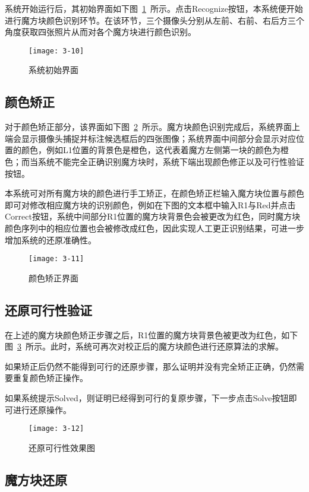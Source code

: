 系统开始运行后，其初始界面如下图~\ref{fig:3-10}~所示。点击Recognize按钮，本系统便开始进行魔方块颜色识别环节。在该环节，三个摄像头分别从左前、右前、右后方三个角度获取四张照片从而对各个魔方块进行颜色识别。

\begin{figure}[H]
	\centering
	\texttt{[image: 3-10]}
	\caption{系统初始界面}\label{fig:3-10}
\end{figure}

\subsection{颜色矫正}

对于颜色矫正部分，该界面如下图~\ref{fig:3-11}~所示。魔方块颜色识别完成后，系统界面上端会显示摄像头捕捉并标注候选框后的四张图像；系统界面中间部分会显示对应位置的颜色，例如L1位置的背景色是橙色，这代表着魔方左侧第一块的颜色为橙色；而当系统不能完全正确识别魔方块时，系统下端出现颜色修正以及可行性验证按钮。

本系统可对所有魔方块的颜色进行手工矫正，在颜色矫正栏输入魔方块位置与颜色即可对修改相应魔方块的识别颜色，例如在下图的文本框中输入R1与Red并点击Correct按钮，系统中间部分R1位置的魔方块背景色会被更改为红色，同时魔方块颜色序列中的相应位置也会被修改成红色，因此实现人工更正识别结果，可进一步增加系统的还原准确性。

\begin{figure}[H]
	\centering
	\texttt{[image: 3-11]}
	\caption{颜色矫正界面}\label{fig:3-11}
\end{figure}

\subsection{还原可行性验证}

在上述的魔方块颜色矫正步骤之后，R1位置的魔方块背景色被更改为红色，如下图~\ref{fig:3-12}~所示。此时，系统可再次对校正后的魔方块颜色进行还原算法的求解。

如果矫正后仍然不能得到可行的还原步骤，那么证明并没有完全矫正正确，仍然需要重复颜色矫正操作。

如果系统提示Solved，则证明已经得到可行的复原步骤，下一步点击Solve按钮即可进行还原操作。

\begin{figure}[H]
	\centering
	\texttt{[image: 3-12]}
	\caption{还原可行性效果图}\label{fig:3-12}
\end{figure}

\subsection{魔方块还原}


